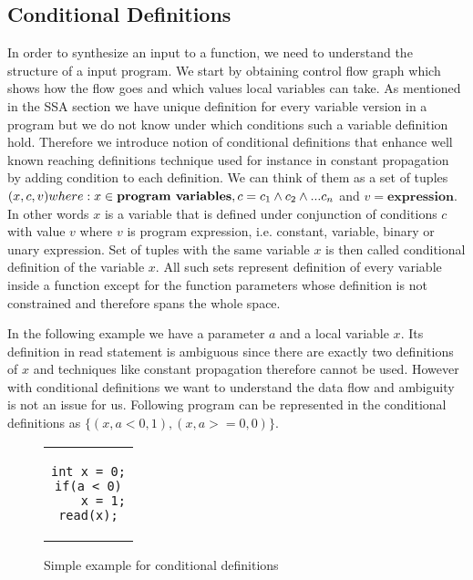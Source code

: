 \documentclass[letterpaper,12pt]{article}
\begin{document}
\subsection{Conditional Definitions}
In order to synthesize an input to a function, we need to understand the structure of a input program. We start by obtaining control flow graph which shows how the flow goes and which values local variables can take. As mentioned in the SSA section we have unique definition for every variable version in a program but we do not know under which conditions such a variable definition hold. Therefore we introduce notion of conditional definitions that enhance well known reaching definitions technique used for instance in constant propagation by adding condition to each definition. We can think of them as a set of tuples $(x,c,v) where: \\x \in \textbf{program variables}, c = c_1 \land c_2 \land ... c_n$ and $v = \textbf{expression}$. In other words $x$ is a variable that is defined under conjunction of conditions $c$ with value $v$ where $v$ is program expression, i.e. constant, variable, binary or unary expression. Set of tuples with the same variable $x$ is then called conditional definition of the variable $x$. All such sets represent definition of every variable inside a function except for the function parameters whose definition is not constrained and therefore spans the whole space. 

In the following example we have a parameter $a$ and a local variable $x$. Its definition in read statement is ambiguous since there are exactly two definitions of $x$ and techniques like constant propagation therefore cannot be used. However with conditional definitions we want to understand the data flow and ambiguity is not an issue for us. Following program can be represented in the conditional definitions as $\{(x, a < 0, 1), (x, a >= 0, 0)\}.$ 

\begin{figure}[thp] %
\centering 
\caption{Simple example for conditional definitions}
\label{lst:Example}
\begin{tabular}{c}
\begin{lstlisting}
int x = 0;
if(a < 0)
	x = 1;
read(x);
\end{lstlisting}
\end{tabular}
\end{figure}
\end{document}

